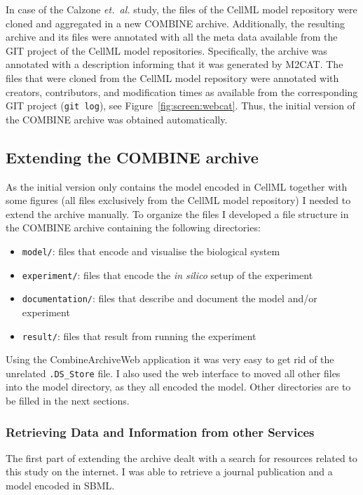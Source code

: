 In case of the Calzone \emph{et.~al.} study, the files of the CellML model repository were cloned and aggregated in a new COMBINE archive.
Additionally, the resulting archive and its files were annotated with all the meta data available from the GIT project of the CellML model repositories.
Specifically, the archive was annotated with a description informing that it was generated by M2CAT.
The files that were cloned from the CellML model repository were annotated with creators, contributors, and modification times as available from the corresponding GIT project (\texttt{git log}), see Figure~\ref{fig:screen:webcat}.
Thus, the initial version of the COMBINE archive was obtained automatically.






\subsection{Extending the COMBINE archive}
\label{sec:extendingarchive}
As the initial version only contains the model encoded in CellML together with some figures (all files exclusively from the CellML model repository) I needed to extend the archive manually.
To organize the files I developed a file structure in the COMBINE archive containing the following directories:
\begin{itemize}
 \item \texttt{model/}: files that encode and visualise the biological system
 \item \texttt{experiment/}: files that encode the \textit{in silico} setup of the experiment
 \item \texttt{documentation/}: files that describe and document the model and/or experiment
 \item \texttt{result/}: files that result from running the experiment
\end{itemize}

Using the CombineArchiveWeb application it was very easy to get rid of the unrelated \texttt{.DS\_Store} file.
I also used the web interface to moved all other files into the model directory, as they all encoded the model.
Other directories are to be filled in the next sections.

\subsubsection{Retrieving Data and Information from other Services}
The first part of extending the archive dealt with a search for resources related to this study on the internet.
I was able to retrieve a journal publication and a model encoded in SBML.

